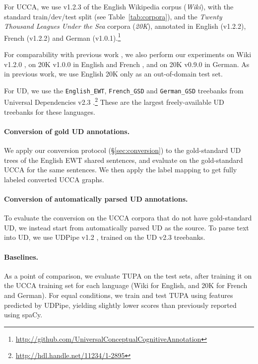 \documentclass[11pt,a4paper]{article}
\begin{document}
For UCCA, we use v1.2.3 of the English Wikipedia corpus (\textit{Wiki}),
with the standard train/dev/test split (see Table~\ref{tab:corpora}),
and the \textit{Twenty Thousand Leagues Under the Sea} corpora (\textit{20K}),
annotated in English (v1.2.2), French (v1.2.2)
and German (v1.0.1).\footnote{\url{http://github.com/UniversalConceptualCognitiveAnnotation}}

For comparability with previous work \cite{hershcovich2017a,hershcovich2018multitask},
we also perform our experiments on Wiki v1.2.0 \cite{abend2013universal},
on 20K v1.0.0 in English and French \cite{sulem2015conceptual},
and on 20K v0.9.0 in German.
As in previous work, we use English 20K only as an out-of-domain test set.

For UD, we use the \texttt{English\_EWT}, \texttt{French\_GSD} and \texttt{German\_GSD}
treebanks from Universal Dependencies v2.3
\cite{11234/1-2895}.\footnote{\url{http://hdl.handle.net/11234/1-2895}}
These are the largest freely-available UD treebanks for these languages.


\paragraph{Conversion of gold UD annotations.}

We apply our conversion protocol (\S\ref{sec:conversion}) to
the gold-standard UD trees of the English EWT shared sentences,
and evaluate on the gold-standard UCCA for the same sentences.
We then apply the label mapping to get fully labeled converted UCCA graphs.

\paragraph{Conversion of automatically parsed UD annotations.}

To evaluate the conversion on the UCCA corpora that do not have gold-standard UD,
we instead start from automatically parsed UD as the source.
To parse text into UD, we use UDPipe v1.2 \cite{udpipe,udpipe:2017},
trained on the UD v2.3 treebanks.

\paragraph{Baselines.}

As a point of comparison, we evaluate TUPA \cite{hershcovich2017a} on the test sets,
after training it on the UCCA training set for each language (Wiki for English,
and 20K for French and German).
For equal conditions,
we train and test TUPA using features predicted by UDPipe,
yielding slightly lower scores than previously reported using spaCy.%
\end{document}
